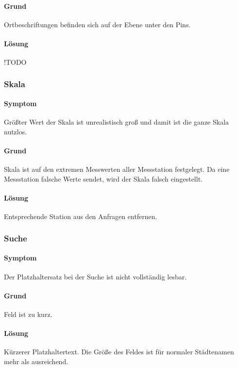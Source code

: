 \paragraph{Grund}
Ortbeschriftungen befinden sich auf der Ebene unter den Pins. 

\paragraph{Lösung}
!TODO

\subsubsection{Skala}
\paragraph{Symptom}
Größter Wert der Skala ist unrealistisch groß und damit ist die ganze Skala nutzlos.

\paragraph{Grund}
Skala ist auf den extremen Messwerten aller Messstation festgelegt. 
Da eine Messstation falsche Werte sendet, wird der Skala falsch eingestellt. 

\paragraph{Lösung}
Entsprechende Station aus den Anfragen entfernen.

\subsubsection{Suche}
\paragraph{Symptom}
Der Platzhaltersatz bei der Suche ist nicht vollständig lesbar.

\paragraph{Grund}
Feld  ist zu kurz.

\paragraph{Lösung}
Kürzerer Platzhaltertext. Die Größe des Feldes ist für normaler Städtenamen mehr als ausreichend.

